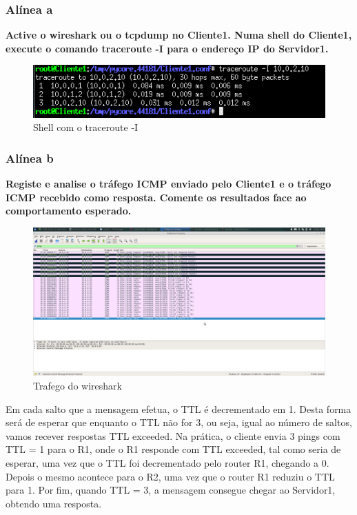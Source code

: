 \documentclass{article}
\begin{document}
\subsubsection{Alínea a}
\textbf{Active o wireshark ou o tcpdump no Cliente1. Numa shell do Cliente1, execute o comando traceroute -I para o endereço IP do Servidor1.}		
\begin{figure}[h]
	\centering
	\includegraphics[scale = 0.8]{traceroute-ex1.png}
	\caption{Shell com o traceroute -I}
\end{figure}
\newpage
\subsubsection{Alínea b}	
\textbf{Registe e analise o tráfego ICMP enviado pelo Cliente1 e o tráfego ICMP recebido como resposta. Comente os resultados face ao comportamento esperado.}\\\par
\begin{figure}[h]
	\centering
	\includegraphics[scale = 0.2]{trafego-ex1.png}
	\caption{Trafego do wireshark}
\end{figure}	
Em cada salto que a mensagem efetua, o TTL é decrementado em 1. Desta forma será de esperar que enquanto o TTL não for 3, ou seja, igual ao número de saltos, vamos recever respostas TTL exceeded. Na prática, o cliente envia 3 pings com TTL = 1 para o R1, onde o R1 responde com TTL exceeded, tal como seria de esperar, uma vez que o TTL foi decrementado pelo router R1, chegando a 0. Depois o mesmo acontece para o R2, uma vez que o router R1 reduziu o TTL para 1. Por fim, quando TTL = 3, a mensagem consegue chegar  ao Servidor1, obtendo uma resposta.\\
\end{document}
